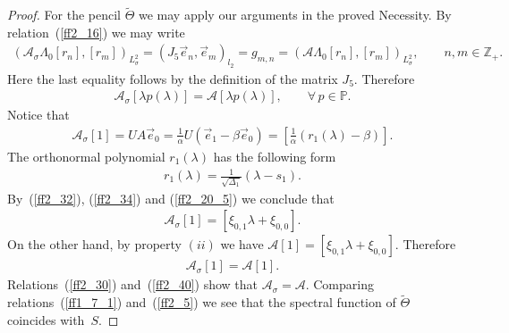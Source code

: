 \begin{proof}
For the pencil $\widetilde\Theta$ we may apply our arguments in the proved Necessity. By relation~(\ref{ff2_16}) we may write
\begin{gather*} (\mathcal{A}_\sigma \Lambda_0 [r_n],[r_m])_{L^2_\sigma} = (J_5 \vec e_n, \vec e_m)_{l_2} = g_{m,n} = (\mathcal{A} \Lambda_0 [r_n],[r_m])_{L^2_\sigma},\qquad n,m\in\mathbb{Z}_+. \end{gather*}
Here the last equality follows by the def\/inition of the matrix $J_5$. Therefore
\begin{gather}\label{ff2_30}
\mathcal{A}_\sigma [ \lambda p(\lambda) ] = \mathcal{A} [ \lambda p(\lambda) ],\qquad \forall\, p\in\mathbb{P}.
\end{gather}
Notice that
\begin{gather}\label{ff2_32}
\mathcal{A}_\sigma [ 1 ] = U A \vec e_0 =\frac{1}{\alpha} U (\vec e_1 - \beta \vec e_0)=\left[ \frac{1}{\alpha} (r_1(\lambda) - \beta) \right].
\end{gather}
The orthonormal polynomial $r_1(\lambda)$ has the following form
\begin{gather}\label{ff2_34}
r_1(\lambda) = \frac{1}{\sqrt{\Delta_1}} (\lambda - s_1).
\end{gather}
By~(\ref{ff2_32}), (\ref{ff2_34}) and (\ref{ff2_20_5}) we conclude that
\begin{gather*} \mathcal{A}_\sigma [ 1 ] = [ \xi_{0,1} \lambda + \xi_{0,0} ]. \end{gather*}
On the other hand, by property $(ii)$ we have $\mathcal{A} [ 1 ] = [ \xi_{0,1} \lambda + \xi_{0,0} ]$. Therefore
\begin{gather}\label{ff2_40}
\mathcal{A}_\sigma [ 1 ] = \mathcal{A} [ 1 ].
\end{gather}
Relations~(\ref{ff2_30}) and~(\ref{ff2_40}) show that $\mathcal{A}_\sigma = \mathcal{A}$. Comparing relations~(\ref{ff1_7_1}) and~(\ref{ff2_5}) we see that the spectral function of $\widetilde\Theta$ coincides with~$S$.
\end{proof}
